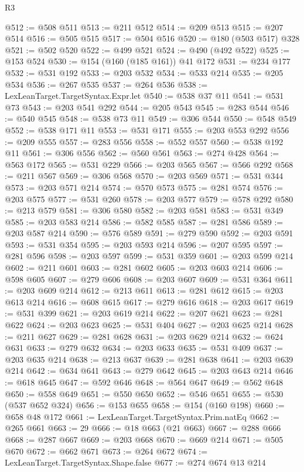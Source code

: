 \begin{lexlean}{R3}
\begin{coremodule}
@512 := @508 @511
@513 := @211 @512
@514 := @209 @513
@515 := @207 @514
@516 := @505 @515
@517 := @504 @516
@520 := @180 (@503 @517) @328
@521 := @502 @520
@522 := @499 @521
@524 := @490 (@492 @522)
@525 := @153 @524
@530 := @154 (@160 (@185 @161)) @41 @172
@531 := @234 @177
@532 := @531 @192
@533 := @203 @532
@534 := @533 @214
@535 := @205 @534
@536 := @267 @535
@537 := @264 @536
@538 := LexLeanTarget.TargetSyntax.Expr.let
@540 := @538 @37 @11
@541 := @531 @73
@543 := @203 @541 @292
@544 := @205 @543
@545 := @283 @544
@546 := @540 @545
@548 := @538 @73 @11
@549 := @306 @544
@550 := @548 @549
@552 := @538 @171 @11
@553 := @531 @171
@555 := @203 @553 @292
@556 := @209 @555
@557 := @283 @556
@558 := @552 @557
@560 := @538 @192 @11
@561 := @306 @556
@562 := @560 @561
@563 := @274 @428
@564 := @563 @172
@565 := @531 @229
@566 := @203 @565
@567 := @566 @292
@568 := @211 @567
@569 := @306 @568
@570 := @203 @569
@571 := @531 @344
@573 := @203 @571 @214
@574 := @570 @573
@575 := @281 @574
@576 := @203 @575
@577 := @531 @260
@578 := @203 @577
@579 := @578 @292
@580 := @213 @579
@581 := @306 @580
@582 := @203 @581
@583 := @531 @349
@585 := @203 @583 @214
@586 := @582 @585
@587 := @281 @586
@589 := @203 @587 @214
@590 := @576 @589
@591 := @279 @590
@592 := @203 @591
@593 := @531 @354
@595 := @203 @593 @214
@596 := @207 @595
@597 := @281 @596
@598 := @203 @597
@599 := @531 @359
@601 := @203 @599 @214
@602 := @211 @601
@603 := @281 @602
@605 := @203 @603 @214
@606 := @598 @605
@607 := @279 @606
@608 := @203 @607
@609 := @531 @364
@611 := @203 @609 @214
@612 := @213 @611
@613 := @281 @612
@615 := @203 @613 @214
@616 := @608 @615
@617 := @279 @616
@618 := @203 @617
@619 := @531 @399
@621 := @203 @619 @214
@622 := @207 @621
@623 := @281 @622
@624 := @203 @623
@625 := @531 @404
@627 := @203 @625 @214
@628 := @211 @627
@629 := @281 @628
@631 := @203 @629 @214
@632 := @624 @631
@633 := @279 @632
@634 := @203 @633
@635 := @531 @409
@637 := @203 @635 @214
@638 := @213 @637
@639 := @281 @638
@641 := @203 @639 @214
@642 := @634 @641
@643 := @279 @642
@645 := @203 @643 @214
@646 := @618 @645
@647 := @592 @646
@648 := @564 @647
@649 := @562 @648
@650 := @558 @649
@651 := @550 @650
@652 := @546 @651
@655 := @530 (@537 @652 @324)
@656 := @153 @655
@658 := @154 (@160 @198)
@660 := @658 @48 @172
@661 := LexLeanTarget.TargetSyntax.Prim.natEq
@662 := @265 @661
@663 := 29
@666 := @18 @663 (@21 @663)
@667 := @288 @666
@668 := @287 @667
@669 := @203 @668
@670 := @669 @214
@671 := @505 @670
@672 := @662 @671
@673 := @264 @672
@674 := LexLeanTarget.TargetSyntax.Shape.false
@677 := @274 @674 @13 @214

\end{coremodule}
\end{lexlean}
